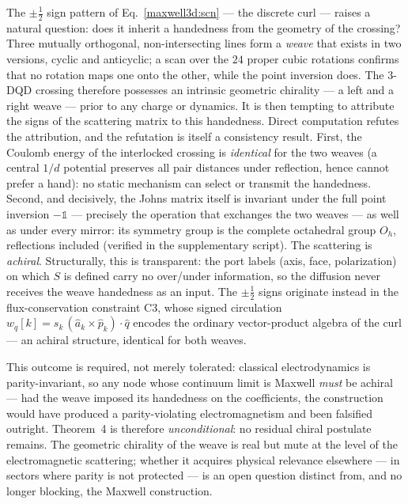 \documentclass[11pt,a4paper]{article}
\theoremstyle{plain}
\theoremstyle{remark}
\begin{document}
The $\pm\tfrac12$ sign pattern of Eq.~\eqref{maxwell3d:scn} --- the discrete curl --- raises a natural question: does it inherit a handedness from the geometry of the crossing? Three mutually orthogonal, non-intersecting lines form a \emph{weave} that exists in two versions, cyclic and anticyclic; a scan over the $24$ proper cubic rotations confirms that no rotation maps one onto the other, while the point inversion does. The 3-DQD crossing therefore possesses an intrinsic geometric chirality --- a left and a right weave --- prior to any charge or dynamics. It is then tempting to attribute the signs of the scattering matrix to this handedness. Direct computation refutes the attribution, and the refutation is itself a consistency result. First, the Coulomb energy of the interlocked crossing is \emph{identical} for the two weaves (a central $1/d$ potential preserves all pair distances under reflection, hence cannot prefer a hand): no static mechanism can select or transmit the handedness. Second, and decisively, the Johns matrix itself is invariant under the full point inversion $-\mathbb{1}$ --- precisely the operation that exchanges the two weaves --- as well as under every mirror: its symmetry group is the complete octahedral group $O_h$, reflections included (verified in the supplementary script). The scattering is \emph{achiral}. Structurally, this is transparent: the port labels (axis, face, polarization) on which $S$ is defined carry no over/under information, so the diffusion never receives the weave handedness as an input. The $\pm\tfrac12$ signs originate instead in the flux-conservation constraint C3, whose signed circulation $w_q[k]=s_k\,(\hat a_k\times\hat p_k)\cdot\hat q$ encodes the ordinary vector-product algebra of the curl --- an achiral structure, identical for both weaves.

This outcome is required, not merely tolerated: classical electrodynamics is parity-invariant, so any node whose continuum limit is Maxwell \emph{must} be achiral --- had the weave imposed its handedness on the coefficients, the construction would have produced a parity-violating electromagnetism and been falsified outright. Theorem~4 is therefore \emph{unconditional}: no residual chiral postulate remains. The geometric chirality of the weave is real but mute at the level of the electromagnetic scattering; whether it acquires physical relevance elsewhere --- in sectors where parity is not protected --- is an open question distinct from, and no longer blocking, the Maxwell construction.
\end{document}
